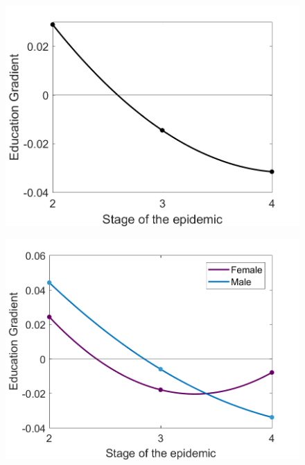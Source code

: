\begin{figure}[H]
\centering
\begin{minipage}{.5\textwidth}
 \centering
\includegraphics[width = 1\linewidth, height = 0.25\textheight]{figures/gradient/fig_grad1.png}
\label{fig_grad1}
\end{minipage}%
\begin{minipage}{.5\textwidth}
\centering
{}
\includegraphics[width = 1\linewidth, height = 0.25\textheight]{figures/gradient/fig_grad2.png}
\label{fig_grad2}
\end{minipage}
\end{figure}

